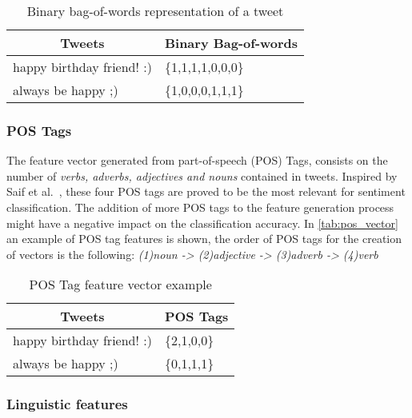\begin{table}[H]
\centering
\caption{Binary bag-of-words representation of a tweet}
\label{tab:binary_bagofwords}
\begin{tabular}{l|l}
\multicolumn{1}{c|}{{\color[HTML]{000000} \textbf{Tweets}}} & \multicolumn{1}{c}{{\color[HTML]{000000} \textbf{Binary Bag-of-words}}} \\ \hline
{\color[HTML]{000000} happy birthday friend! :)}            & {\color[HTML]{000000} \{1,1,1,1,0,0,0\}}                                \\ \hline
always be happy ;)                                          & \{1,0,0,0,1,1,1\}                                                      
\end{tabular}
\end{table}

\subsubsection{POS Tags}

The feature vector generated from part-of-speech (POS) Tags, consists on the number of \textit{verbs, adverbs, adjectives and nouns} contained in tweets. Inspired by Saif et al.~\cite{MohammadKZ2013}, these four POS tags are proved to be the most relevant for sentiment classification. The addition of more POS tags to the feature generation process might have a negative impact on the classification accuracy. In \autoref{tab:pos_vector} an example of POS tag features is shown, the order of POS tags for the creation of vectors is the following:  \textit{(1)noun -> (2)adjective -> (3)adverb -> (4)verb}

\begin{table}[H]
\centering
\caption{POS Tag feature vector example}
\label{tab:pos_vector}
\begin{tabular}{l|l}
\multicolumn{1}{c|}{{\color[HTML]{000000} \textbf{Tweets}}} & \multicolumn{1}{c}{{\color[HTML]{000000} \textbf{POS Tags}}} \\ \hline
{\color[HTML]{000000} happy birthday friend! :)}            & {\color[HTML]{000000} \{2,1,0,0\}}                           \\ \hline
always be happy ;)                                          & \{0,1,1,1\}                                                 
\end{tabular}
\end{table}

\subsubsection{Linguistic features}

